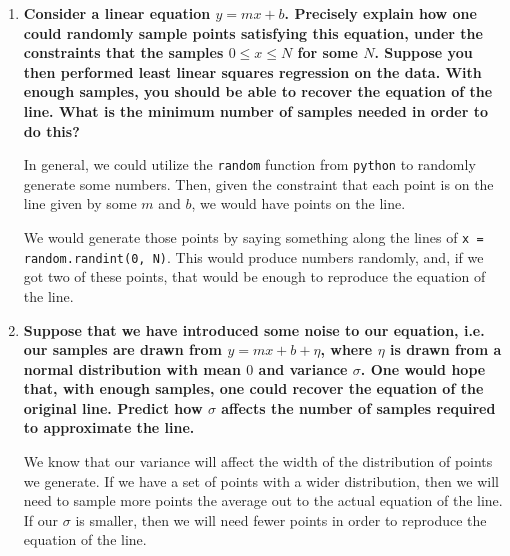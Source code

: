 \documentclass[11pt]{article}
\begin{document}
    \begin{enumerate}
        \item \textbf{Consider a linear equation $y = mx + b$. Precisely explain 
            how one could randomly sample points satisfying this equation, under 
            the constraints that the samples $0 \leq x \leq N$ for some $N$. Suppose you then 
            performed least linear squares regression on the data. With enough 
            samples, you should be able to recover the equation of the line. What 
            is the minimum number of samples needed in order to do this?}

            In general, we could utilize the \texttt{random} function from
            \texttt{python} to randomly generate some numbers. Then, given the
            constraint that each point is on the line given by some $m$ and
            $b$, we would have points on the line.

            We would generate those points by saying something along the lines
            of \texttt{x = random.randint(0, N)}. This would produce numbers
            randomly, and, if we got two of these points, that would be enough
            to reproduce the equation of the line.
        \item \textbf{Suppose that we have introduced some noise to our equation, 
            i.e. our samples are drawn from $y = mx+ b+ \eta$, where $\eta$ is drawn 
            from a normal distribution with mean $0$ and variance $\sigma$. One would
            hope that, with enough samples, one could recover the equation of 
            the original line. Predict how $\sigma$ affects the number of samples 
            required to approximate the line.}

            We know that our variance will affect the width of the distribution
            of points we generate. If we have a set of points with a wider
            distribution, then we will need to sample more points the average
            out to the actual equation of the line. If our $\sigma$ is smaller,
            then we will need fewer points in order to reproduce the equation
            of the line.
    \end{enumerate}
\end{document}
